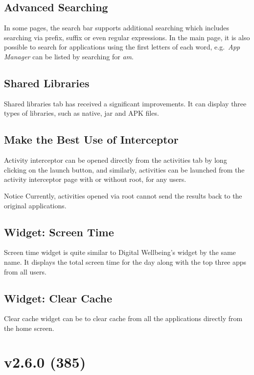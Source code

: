 \subsection{Advanced Searching}
In some pages, the search bar supports additional searching which includes searching via prefix, suffix or even regular expressions.
In the main page, it is also possible to search for applications using the first letters of each word, e.g.\ \textit{App Manager} can be listed by searching for \textit{am}.

\subsection{Shared Libraries}
Shared libraries tab has received a significant improvements. It can display three types of libraries, such as native, jar and APK files.

\subsection{Make the Best Use of Interceptor}
Activity interceptor can be opened directly from the activities tab by long clicking on the launch button, and similarly, activities can be launched from the activity interceptor page with or without root, for any users.

\begin{tip}{Notice}
    Currently, activities opened via root cannot send the results back to the original applications.
\end{tip}

\subsection{Widget: Screen Time}
Screen time widget is quite similar to Digital Wellbeing's widget by the same name.
It displays the total screen time for the day along with the top three apps from all users.

\subsection{Widget: Clear Cache}
Clear cache widget can be to clear cache from all the applications directly from the home screen.


\section{v2.6.0 (385)}\label{sec:v2.6.0-(385)}

